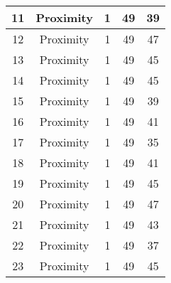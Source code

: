 \documentclass[results.tex]{subfiles}
\begin{document}
\begin{center}
\begin{tabular}{| c || c | c | c | c |}
            \hline
            11                      & Proximity                    & 1                      & 49                      & 39                   \\
            \hline
            12                      & Proximity                    & 1                      & 49                      & 47                   \\
            \hline
            13                      & Proximity                    & 1                      & 49                      & 45                   \\
            \hline
            14                      & Proximity                    & 1                      & 49                      & 45                   \\
            \hline
            15                      & Proximity                    & 1                      & 49                      & 39                   \\
            \hline
            16                      & Proximity                    & 1                      & 49                      & 41                   \\
            \hline
            17                      & Proximity                    & 1                      & 49                      & 35                   \\
            \hline
            18                      & Proximity                    & 1                      & 49                      & 41                   \\
            \hline
            19                      & Proximity                    & 1                      & 49                      & 45                   \\
            \hline
            20                      & Proximity                    & 1                      & 49                      & 47                   \\
            \hline
            21                      & Proximity                    & 1                      & 49                      & 43                   \\
            \hline
            22                      & Proximity                    & 1                      & 49                      & 37                   \\
            \hline
            23                      & Proximity                    & 1                      & 49                      & 45                   \\

\end{tabular}
\end{center}
\end{document}
